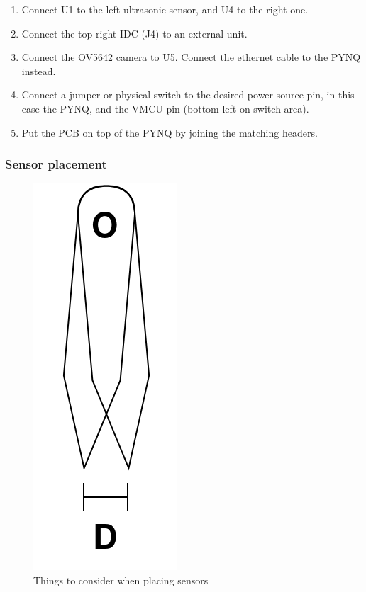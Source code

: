 \begin{enumerate}
    \item Connect U1 to the left ultrasonic sensor, and U4 to the right one. 
    \item Connect the top right IDC (J4) to an external unit. 
    \item \sout{Connect the OV5642 camera to U5.} Connect the ethernet cable to the PYNQ instead. 
    \item Connect a jumper or physical switch to the desired power source pin, in this case the PYNQ, and the VMCU pin (bottom left on  switch area).
    \item Put the PCB on top of the PYNQ by joining the matching headers.
\end{enumerate}


\subsubsection{Sensor placement}

\begin{figure}
    \centering
    \includegraphics[scale=0.25]{Images/Ultra_Distance.png}
    \caption{Things to consider when placing sensors}
    \label{fig:ultra_dist}
\end{figure}

